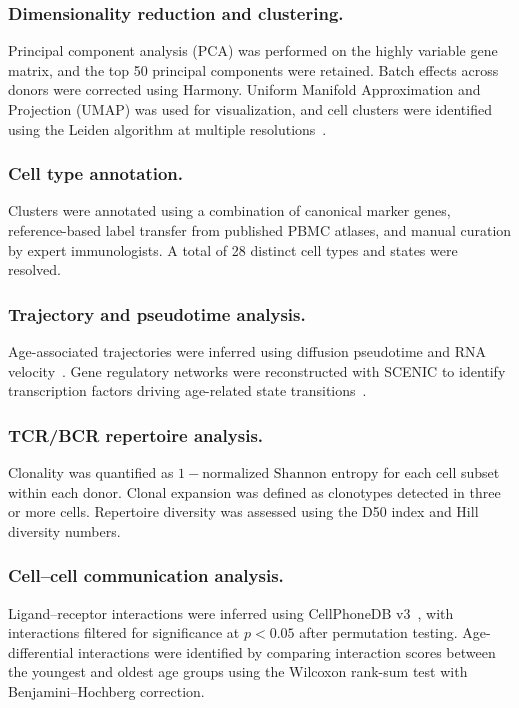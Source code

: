 \documentclass[11pt]{article}
\begin{document}
\subsubsection{Dimensionality reduction and clustering.}
Principal component analysis (PCA) was performed on the highly variable gene matrix, and the top 50 principal components were retained. Batch effects across donors were corrected using Harmony. Uniform Manifold Approximation and Projection (UMAP) was used for visualization, and cell clusters were identified using the Leiden algorithm at multiple resolutions~\citep{satija2015spatial}.

\subsubsection{Cell type annotation.}
Clusters were annotated using a combination of canonical marker genes, reference-based label transfer from published PBMC atlases, and manual curation by expert immunologists. A total of 28 distinct cell types and states were resolved.

\subsubsection{Trajectory and pseudotime analysis.}
Age-associated trajectories were inferred using diffusion pseudotime and RNA velocity~\citep{trapnell2014dynamics}. Gene regulatory networks were reconstructed with SCENIC to identify transcription factors driving age-related state transitions~\citep{aibar2017scenic}.

\subsubsection{TCR/BCR repertoire analysis.}
Clonality was quantified as $1 - \text{normalized Shannon entropy}$ for each cell subset within each donor. Clonal expansion was defined as clonotypes detected in three or more cells. Repertoire diversity was assessed using the D50 index and Hill diversity numbers.

\subsubsection{Cell--cell communication analysis.}
Ligand--receptor interactions were inferred using CellPhoneDB v3~\citep{efremova2020cellphonedb}, with interactions filtered for significance at $p < 0.05$ after permutation testing. Age-differential interactions were identified by comparing interaction scores between the youngest and oldest age groups using the Wilcoxon rank-sum test with Benjamini--Hochberg correction.
\end{document}
